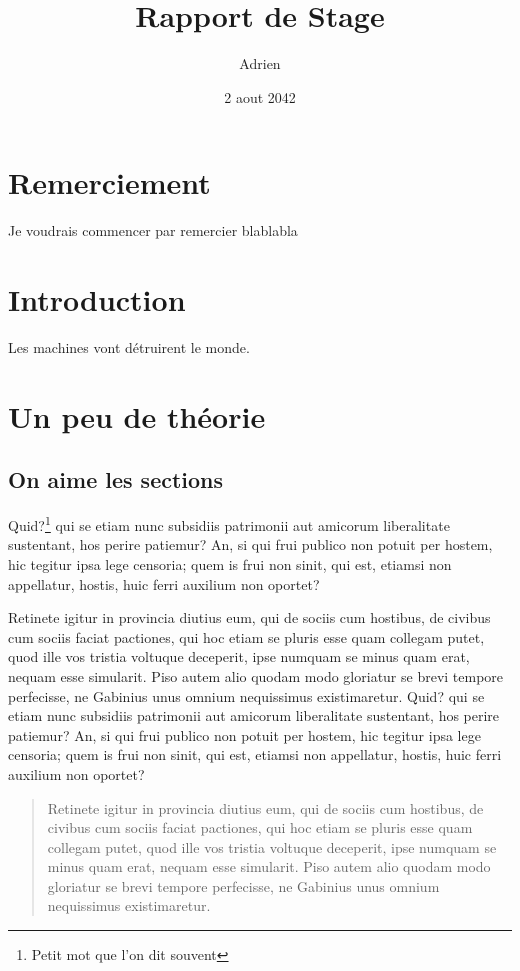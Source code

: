 \documentclass{report}
\title{Rapport de Stage}
\author{Adrien \bsc{Sanchez}}
\date{2 aout 2042}
\begin{document}
\pagestyle{fancy}

\renewcommand{\headheight}{13pt}
\lhead{\thechapter }
\chead{}
\rhead{\leftmark }
\lfoot{}
\cfoot{\thepage }


\maketitle

\chapter*{Remerciement}
Je voudrais commencer par remercier blablabla

\chapter*{Introduction}
Les machines vont détruirent le monde.

\chapter{Un peu de théorie}

\section{On aime les sections}

Quid?\footnote{Petit mot que l'on dit souvent} qui se etiam nunc subsidiis patrimonii aut amicorum liberalitate sustentant,
hos perire patiemur? An, si qui frui publico non potuit per hostem, hic tegitur ipsa
lege censoria; quem is frui non sinit, qui est, etiamsi non appellatur, hostis, huic
ferri auxilium non oportet?
\label{clé1}

Retinete igitur in provincia diutius eum, qui de sociis
cum hostibus, de civibus cum sociis faciat pactiones, qui hoc etiam se pluris esse
quam collegam putet, quod ille vos tristia voltuque deceperit, ipse numquam se minus
quam erat, nequam esse simularit. Piso autem alio quodam modo gloriatur se brevi
tempore perfecisse,
ne Gabinius unus omnium nequissimus existimaretur.
Quid? qui se etiam nunc subsidiis patrimonii aut amicorum liberalitate sustentant,
hos perire patiemur? An, si qui frui publico non potuit per hostem, hic tegitur ipsa
lege censoria; quem is frui non sinit, qui est, etiamsi non appellatur, hostis, huic
ferri auxilium non oportet?

\begin{quotation}
 \og Retinete igitur in provincia diutius eum, qui de sociis
cum hostibus, de civibus cum sociis faciat pactiones, qui hoc etiam se pluris esse
quam collegam putet, quod ille vos tristia voltuque deceperit, ipse numquam se minus
quam erat, nequam esse simularit. Piso autem alio quodam modo gloriatur se brevi
tempore perfecisse,
ne Gabinius unus omnium nequissimus existimaretur.\fg
\end{quotation}
\end{document}
